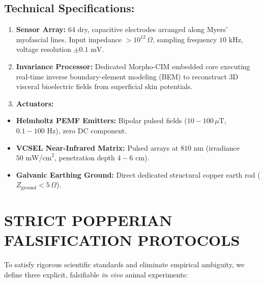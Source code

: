 \documentclass[10pt,twocolumn]{article}
\begin{document}
\subsection{Technical Specifications:}
\begin{enumerate}
  \item \textbf{Sensor Array:} 64 dry, capacitive electrodes arranged along Myers' myofascial lines. Input impedance $> 10^{12}\,\Omega$, sampling frequency $10\text{ kHz}$, voltage resolution $\pm 0.1\text{ mV}$.
  \item \textbf{Invariance Processor:} Dedicated Morpho-CIM embedded core executing real-time inverse boundary-element modeling (BEM) to reconstruct 3D visceral bioelectric fields from superficial skin potentials.
  \item \textbf{Actuators:}
\end{enumerate}
\begin{itemize}
  \item \textbf{Helmholtz PEMF Emitters:} Bipolar pulsed fields ($10 - 100\,\mu\text{T}$, $0.1 - 100\text{ Hz}$), zero DC component.
  \item \textbf{VCSEL Near-Infrared Matrix:} Pulsed arrays at $810\text{ nm}$ (irradiance $50\text{ mW/cm}^2$, penetration depth $4 - 6\text{ cm}$).
  \item \textbf{Galvanic Earthing Ground:} Direct dedicated structural copper earth rod ($Z_{\text{ground}} < 5\,\Omega$).
\end{itemize}



\section{STRICT POPPERIAN FALSIFICATION PROTOCOLS}

To satisfy rigorous scientific standards and eliminate empirical ambiguity, we define three explicit, falsifiable \textit{in vivo} animal experiments:
\end{document}
